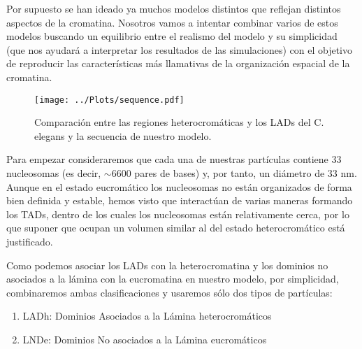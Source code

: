 Por supuesto se han ideado ya muchos modelos distintos que reflejan distintos aspectos de la cromatina. Nosotros vamos a intentar combinar varios de estos modelos buscando un equilibrio entre el realismo del modelo y su simplicidad (que nos ayudará a interpretar los resultados de las simulaciones) con el objetivo de reproducir las características más llamativas de la organización espacial de la cromatina.

\begin{figure}
    \centering
    \texttt{[image: ../Plots/sequence.pdf]}
    \caption{Comparación entre las regiones heterocromáticas y los LADs del C. elegans y la secuencia de nuestro modelo.}
    \label{fig:sequence}
\end{figure}

Para empezar consideraremos que cada una de nuestras partículas contiene 33 nucleosomas (es decir, $\sim6600$ pares de bases) y, por tanto, un diámetro de 33 nm. Aunque en el estado eucromático los nucleosomas no están organizados de forma bien definida y estable, hemos visto que interactúan de varias maneras formando los TADs, dentro de los cuales los nucleosomas están relativamente cerca, por lo que suponer que ocupan un volumen similar al del estado heterocromático está justificado.

Como podemos asociar los LADs con la heterocromatina y los dominios no asociados a la lámina con la eucromatina \cite{Bajpai2021} en nuestro modelo, por simplicidad, combinaremos ambas clasificaciones y usaremos sólo dos tipos de partículas:
\begin{enumerate}
    \item LADh: Dominios Asociados a la Lámina heterocromáticos
    \item LNDe: Dominios No asociados a la Lámina eucromáticos
\end{enumerate}

